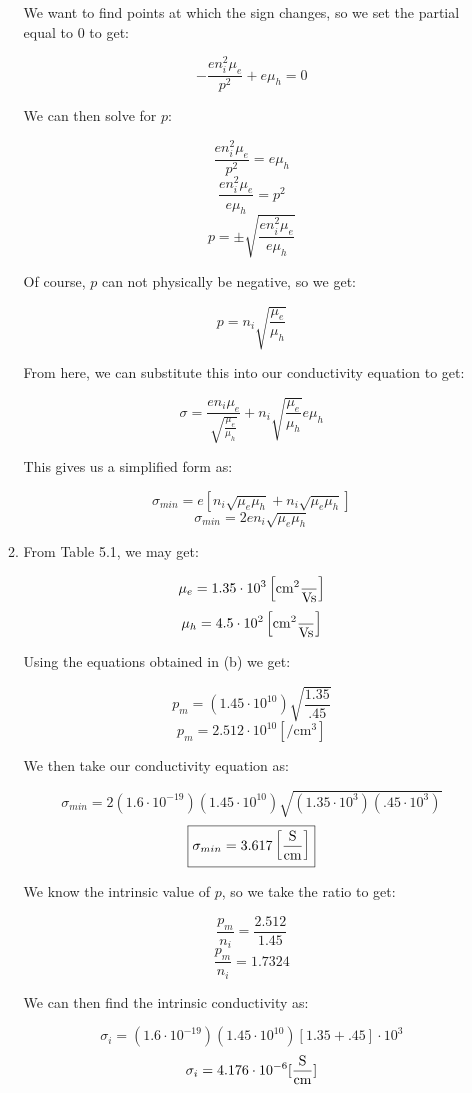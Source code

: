 \begin{enumerate}
\begin{enumerate}[label=\alph*]
        We want to find points at which the sign changes, so we set the partial equal to 0 to get:

        $$-\frac{en_i^2\mu_e}{p^2}+e\mu_h=0$$

        We can then solve for $p$:

        $$\frac{en_i^2\mu_e}{p^2}=e\mu_h$$
        $$\frac{en_i^2\mu_e}{e\mu_h}=p^2$$
        $$p=\pm\sqrt{\frac{en_i^2\mu_e}{e\mu_h}}$$

        Of course, $p$ can not physically be negative, so we get:

        $$\boxed{p=n_i\sqrt{\frac{\mu_e}{\mu_h}}}$$

        From here, we can substitute this into our conductivity equation to get:

        $$\sigma=\frac{en_i\mu_e}{\sqrt{\frac{\mu_e}{\mu_h}}}+n_i\sqrt{\frac{\mu_e}{\mu_h}}e\mu_h$$

        This gives us a simplified form as:

        $$\sigma_{min}=e\left[n_i\sqrt{\mu_e\mu_h}+n_i\sqrt{\mu_e\mu_h}\right]$$
        $$\boxed{\sigma_{min}=2en_i\sqrt{\mu_e\mu_h}}$$

      \item From Table 5.1, we may get:

        $$\mu_{e}=1.35\cdot10^3\left[ \si{\centi\meter\squared\over\volt\second} \right]$$
        $$\mu_{h}=4.5\cdot10^2\left[ \si{\centi\meter\squared\over\volt\second} \right]$$

        Using the equations obtained in (b) we get:

        $$p_m=(1.45\cdot10^{10})\sqrt{\frac{1.35}{.45}}$$
        $$\boxed{p_m=2.512\cdot10^{10}\left[ \si{\per\centi\meter\cubed} \right]}$$

        We then take our conductivity equation as:

        $$\sigma_{min}=2(1.6\cdot10^{-19})(1.45\cdot10^{10})\sqrt{(1.35\cdot10^3)(.45\cdot10^3)}$$
        $$\boxed{\sigma_{min}=3.617\left[ \si{\siemens\over\centi\meter} \right]}$$

        We know the intrinsic value of $p$, so we take the ratio to get:

        $$\frac{p_m}{n_i}=\frac{2.512}{1.45}$$
        $$\frac{p_m}{n_i}=1.7324$$

        We can then find the intrinsic conductivity as:

        $$\sigma_i=\left( 1.6\cdot10^{-19} \right)\left( 1.45\cdot10^{10} \right)\left[ 1.35+.45 \right]\cdot10^{3}$$
        $$\sigma_i=4.176\cdot10^{-6}[\si{\siemens\over\centi\meter}]$$


\end{enumerate}
\end{enumerate}

